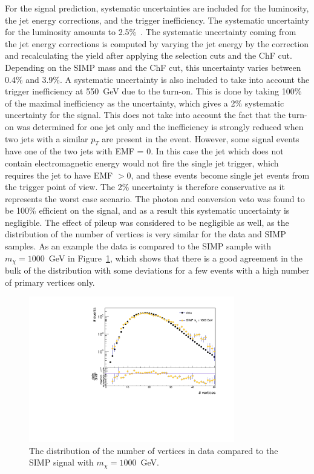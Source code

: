 For the signal prediction, systematic uncertainties are included for the luminosity, the jet energy corrections, and the trigger inefficiency. The systematic uncertainty for the luminosity amounts to 2.5\%~\cite{Kornmayer:2039978}. The systematic uncertainty coming from the jet energy corrections is computed by varying the jet energy by the correction and recalculating the yield after applying the selection cuts and the ChF cut. Depending on the \ac{SIMP} mass and the ChF cut, this uncertainty varies between 0.4\% and 3.9\%. A systematic uncertainty is also included to take into account the trigger inefficiency at \SI{550}{GeV} due to the turn-on. This is done by taking 100\% of the maximal inefficiency as the uncertainty, which gives a 2\% systematic uncertainty for the signal. This does not take into account the fact that the turn-on was determined for one jet only and the inefficiency is strongly reduced when two jets with a similar $p_T$ are present in the event. However, some signal events have one of the two jets with EMF = 0. In this case the jet which does not contain electromagnetic energy would not fire the single jet trigger, which requires the jet to have EMF $> 0$, and these events become single jet events from the trigger point of view. The 2\% uncertainty is therefore conservative as it represents the worst case scenario. The photon and conversion veto was found to be 100\% efficient on the signal, and as a result this systematic uncertainty is negligible. The effect of pileup was considered to be negligible as well, as the distribution of the number of vertices is very similar for the data and \ac{SIMP} samples. As an example the data is compared to the \ac{SIMP} sample with $m_{\chi} = 1000$~GeV in Figure~\ref{fig:PU}, which shows that there is a good agreement in the bulk of the distribution with some deviations for a few events with a high number of primary vertices only.

\begin{figure}[ht]
  \centering
  \includegraphics[width=0.8\textwidth]{figures/PU_reweighting_SIMP_M-1000.pdf}\hfill%
  \caption{The distribution of the number of vertices in data compared to the \ac{SIMP} signal with $m_{\chi} = 1000$~GeV.}
  \label{fig:PU}
\end{figure}

